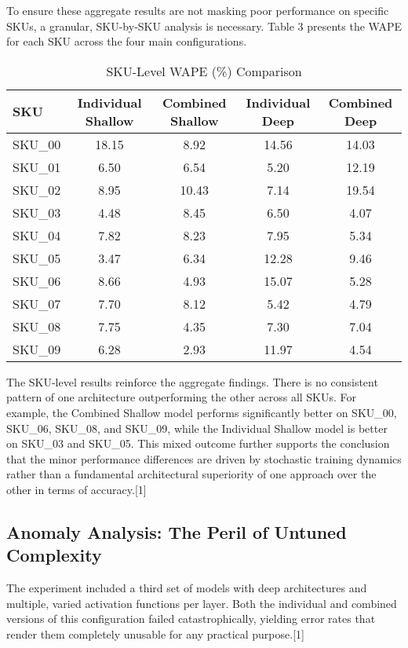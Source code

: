 \documentclass{article}
\begin{document}
To ensure these aggregate results are not masking poor performance on specific SKUs, a granular, SKU-by-SKU analysis is necessary. Table 3 presents the WAPE for each SKU across the four main configurations.

\begin{table}[h!]
\centering
\caption{SKU-Level WAPE (\%) Comparison}
\begin{tabular}{@{}lcccc@{}}
\toprule
SKU & Individual Shallow & Combined Shallow & Individual Deep & Combined Deep \\
\midrule
SKU\_00 & 18.15 & 8.92 & 14.56 & 14.03 \\
SKU\_01 & 6.50 & 6.54 & 5.20 & 12.19 \\
SKU\_02 & 8.95 & 10.43 & 7.14 & 19.54 \\
SKU\_03 & 4.48 & 8.45 & 6.50 & 4.07 \\
SKU\_04 & 7.82 & 8.23 & 7.95 & 5.34 \\
SKU\_05 & 3.47 & 6.34 & 12.28 & 9.46 \\
SKU\_06 & 8.66 & 4.93 & 15.07 & 5.28 \\
SKU\_07 & 7.70 & 8.12 & 5.42 & 4.79 \\
SKU\_08 & 7.75 & 4.35 & 7.30 & 7.04 \\
SKU\_09 & 6.28 & 2.93 & 11.97 & 4.54 \\
\bottomrule
\end{tabular}
\label{tab:sku_wape}
\end{table}

The SKU-level results reinforce the aggregate findings. There is no consistent pattern of one architecture outperforming the other across all SKUs. For example, the Combined Shallow model performs significantly better on SKU\_00, SKU\_06, SKU\_08, and SKU\_09, while the Individual Shallow model is better on SKU\_03 and SKU\_05. This mixed outcome further supports the conclusion that the minor performance differences are driven by stochastic training dynamics rather than a fundamental architectural superiority of one approach over the other in terms of accuracy.[1]

\subsection{Anomaly Analysis: The Peril of Untuned Complexity}

The experiment included a third set of models with deep architectures and multiple, varied activation functions per layer. Both the individual and combined versions of this configuration failed catastrophically, yielding error rates that render them completely unusable for any practical purpose.[1]
\end{document}
